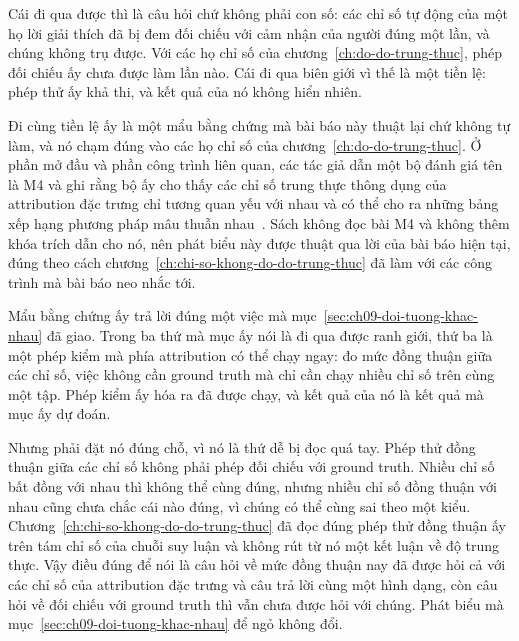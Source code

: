 Cái đi qua được thì là câu hỏi chứ không phải con số: các chỉ số
tự động của một họ lời giải thích đã bị đem đối chiếu với cảm nhận của người
đúng một lần, và chúng không trụ được. Với các họ chỉ số của
chương~\ref{ch:do-do-trung-thuc}, phép đối chiếu ấy chưa được làm lần nào. Cái
đi qua biên giới vì thế là một tiền lệ: phép thử ấy khả thi, và kết quả của nó
không hiển nhiên.

Đi cùng tiền lệ ấy là một mẩu bằng chứng mà bài báo này thuật lại chứ không tự
làm, và nó chạm đúng vào các họ chỉ số của
chương~\ref{ch:do-do-trung-thuc}. Ở phần mở đầu và phần công trình liên quan,
các tác giả dẫn một bộ đánh giá tên là M4 và ghi rằng bộ ấy cho thấy các chỉ
số trung thực thông dụng của attribution đặc trưng chỉ tương quan yếu với
nhau và có thể cho ra những bảng xếp hạng phương pháp mâu thuẫn
nhau~\autocite{p25userperception}. Sách không đọc bài M4 và không thêm khóa
trích dẫn cho nó, nên phát biểu này được thuật qua lời của bài báo hiện tại,
đúng theo cách chương~\ref{ch:chi-so-khong-do-do-trung-thuc} đã làm với các
công trình mà bài báo neo nhắc tới.

Mẩu bằng chứng ấy trả lời đúng một việc mà
mục~\ref{sec:ch09-doi-tuong-khac-nhau} đã giao. Trong ba thứ mà mục ấy nói là
đi qua được ranh giới, thứ ba là một phép kiểm mà phía attribution có thể chạy
ngay: đo mức đồng thuận giữa các chỉ số, việc không cần ground truth mà chỉ
cần chạy nhiều chỉ số trên cùng một tập. Phép kiểm ấy hóa ra đã được chạy, và
kết quả của nó là kết quả mà mục ấy dự đoán.

Nhưng phải đặt nó đúng chỗ, vì nó là thứ dễ bị đọc quá tay. Phép thử đồng
thuận giữa các chỉ số không phải phép đối chiếu với ground truth. Nhiều chỉ số
bất đồng với nhau thì không thể cùng đúng, nhưng nhiều chỉ số đồng thuận với
nhau cũng chưa chắc cái nào đúng, vì chúng có thể cùng sai theo một kiểu.
Chương~\ref{ch:chi-so-khong-do-do-trung-thuc} đã đọc đúng phép thử đồng thuận
ấy trên tám chỉ số của chuỗi suy luận và không rút từ nó một kết luận về độ
trung thực. Vậy điều đúng để nói là câu hỏi về mức đồng thuận nay đã được hỏi
cả với các chỉ số của attribution đặc trưng và câu trả lời cùng một hình dạng,
còn câu hỏi về đối chiếu với ground truth thì vẫn chưa được hỏi với chúng.
Phát biểu mà mục~\ref{sec:ch09-doi-tuong-khac-nhau} để ngỏ không đổi.

%
